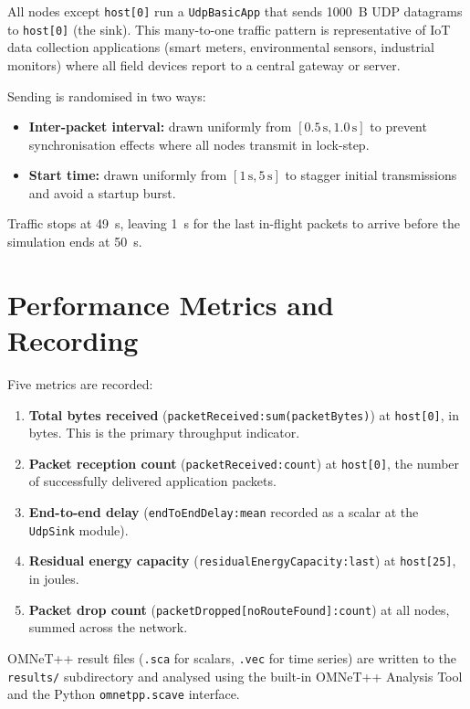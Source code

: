 All nodes except \texttt{host[0]} run a \texttt{UdpBasicApp} that sends 1000~B UDP
datagrams to \texttt{host[0]} (the sink). This many-to-one traffic pattern is
representative of IoT data collection applications (smart meters, environmental sensors,
industrial monitors) where all field devices report to a central gateway or server.

Sending is randomised in two ways:
\begin{itemize}
  \item \textbf{Inter-packet interval:} drawn uniformly from $[0.5\,\text{s}, 1.0\,\text{s}]$
    to prevent synchronisation effects where all nodes transmit in lock-step.
  \item \textbf{Start time:} drawn uniformly from $[1\,\text{s}, 5\,\text{s}]$ to stagger
    initial transmissions and avoid a startup burst.
\end{itemize}

Traffic stops at 49~s, leaving 1~s for the last in-flight packets to arrive before the
simulation ends at 50~s.

\section{Performance Metrics and Recording}

Five metrics are recorded:

\begin{enumerate}
  \item \textbf{Total bytes received} (\texttt{packetReceived:sum(packetBytes)}) at
    \texttt{host[0]}, in bytes. This is the primary throughput indicator.
  \item \textbf{Packet reception count} (\texttt{packetReceived:count}) at
    \texttt{host[0]}, the number of successfully delivered application packets.
  \item \textbf{End-to-end delay} (\texttt{endToEndDelay:mean} recorded as a scalar at
    the \texttt{UdpSink} module).
  \item \textbf{Residual energy capacity} (\texttt{residualEnergyCapacity:last}) at
    \texttt{host[25]}, in joules.
  \item \textbf{Packet drop count} (\texttt{packetDropped[noRouteFound]:count}) at all
    nodes, summed across the network.
\end{enumerate}

OMNeT++ result files (\texttt{.sca} for scalars, \texttt{.vec} for time series) are
written to the \texttt{results/} subdirectory and analysed using the built-in OMNeT++
Analysis Tool and the Python \texttt{omnetpp.scave} interface.

